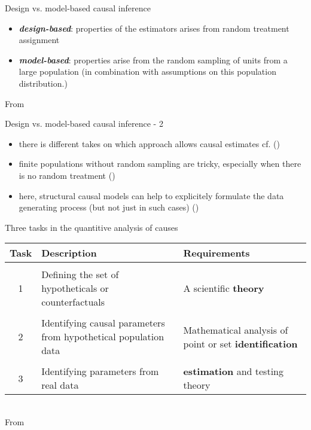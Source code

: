 \documentclass[aspectratio=169]{beamer}
\begin{document}
	\begin{frame}{Design vs. model-based causal inference}
		\begin{itemize}
			\item \textit{\textbf{design-based}}: properties of the estimators arises from random treatment assignment
			\item \textit{\textbf{model-based}}: properties arise from the random sampling of units from a large population (in combination with assumptions on this population distribution.)
		\end{itemize}
		\vspace*{.5cm} From \cite{Athey2022}
	\end{frame}

	\begin{frame}{Design vs. model-based causal inference - 2}
		\begin{itemize}
			\item there is different takes on which approach allows causal estimates cf. (\cite{Card2022, Heckman2008})
			\item finite populations without random sampling are tricky, especially when there is no random treatment (\cite{Sterba2009, Abadie2020})
			\item here, structural causal models can help to explicitely formulate the data generating process (but not just in such cases) (\cite{Cinelli2022})
		\end{itemize}
	\end{frame}

	\begin{frame}{Three tasks in the quantitive analysis of causes}
		\begin{centering}
			\begin{tabular}{cp{6.5cm}p{3cm}}
				Task & Description & Requirements \\
				\hline \hline \\
					1 & Defining the set of hypotheticals or counterfactuals & A scientific \textbf{theory} \\\\
					2 & Identifying causal parameters from hypothetical population data & Mathematical analysis of point or set  \textbf{identification} \\\\
					3 & Identifying parameters from real data &  \textbf{estimation} and testing theory \\
			\end{tabular}
		\end{centering}
		\\\vspace*{.5cm} From \cite{Heckman2008}
	\end{frame}
\end{document}

